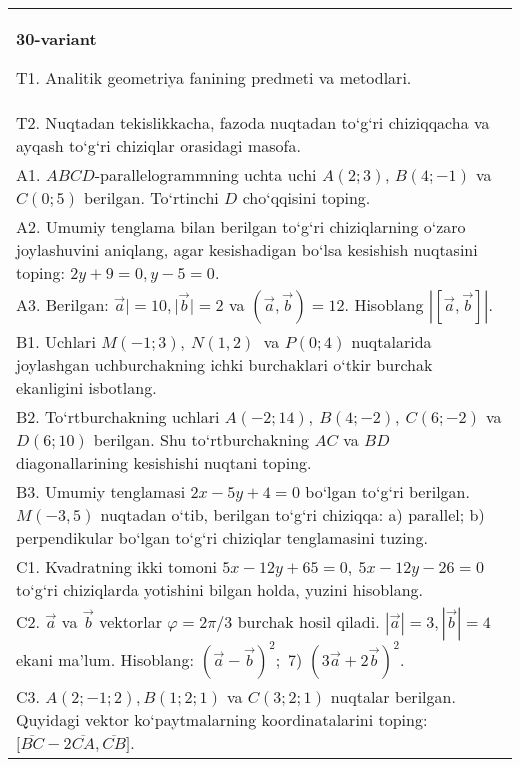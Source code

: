 \documentclass{article}
\begin{document}
\begin{tabular}{m{17cm}}
\textbf{30-variant}

T1. Analitik geometriya fanining predmeti va metodlari.
 \\
T2. 
Nuqtadan tekislikkacha, fazoda nuqtadan to‘g‘ri chiziqqacha va ayqash to‘g‘ri chiziqlar orasidagi masofa.
 \\
A1. 
$ABCD$-parallelogrammning uchta uchi
$A (2;3) $, $B (4;-1) $ va $C (0;5) $ berilgan. To‘rtinchi $D$
cho‘qqisini toping.
 \\
A2. 
Umumiy tenglama bilan berilgan to‘g‘ri chiziqlarning
o‘zaro joylashuvini aniqlang, agar kesishadigan bo‘lsa kesishish nuqtasini
toping: $2y+9=0, y-5=0$.
 \\
A3. 
Berilgan: $\overrightarrow{a}| = 10,|\overrightarrow{b}| = 2$ va
$\left(\overrightarrow{a},\overrightarrow{b} \right) = 12$. Hisoblang
$\left| \left\lbrack \overrightarrow{a},\overrightarrow{b} \right\rbrack \right|$.
 \\
B1. 
Uchlari \(M (-1;3),\ N (1,2) \ \) va \(P (0;4) \)
nuqtalarida joylashgan uchburchakning ichki burchaklari o‘tkir burchak
ekanligini isbotlang.
 \\
B2. 
To‘rtburchakning uchlari
\(A (-2;14),\ B (4;-2),\ C (6;-2) \) va \(D (6;10) \) berilgan. Shu
to‘rtburchakning $AC$ va $BD$ diagonallarining kesishishi
nuqtani toping.
 \\
B3. 
Umumiy tenglamasi \(2x-5y+4=0\) bo‘lgan to‘g‘ri
berilgan. \(M (-3,5) \) nuqtadan o‘tib, berilgan to‘g‘ri chiziqqa: a) parallel;
b) perpendikular bo‘lgan to‘g‘ri chiziqlar tenglamasini tuzing.
 \\
C1. 
Kvadratning ikki tomoni
\(5x-12y+65=0,\ 5x-12y-26=0\) to‘g‘ri chiziqlarda
yotishini bilgan holda, yuzini hisoblang.
 \\
C2. 
$\vec{a}$ va $\vec{b}$ vektorlar $\varphi = 2\pi/3$ burchak hosil qiladi. $|\vec{a}| = 3,|\vec{b}| = 4$ ekani ma’lum. Hisoblang:
$ (\vec{a} - \vec{b}) ^{2};$ 7) $ (3\vec{a} + 2\vec{b}) ^{2}$.
 \\
C3. 
$A (2; -1;2),B (1;2; 1) $ va $C (3;2;1) $ nuqtalar berilgan. Quyidagi vektor ko‘paytmalarning koordinatalarini toping:
$\lbrack\overline{BC} - 2\overline{CA},\overline{CB}\rbrack$. \\

\end{tabular}
\vspace{1cm}
\end{document}
